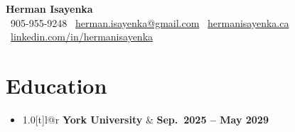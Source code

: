 \documentclass[letterpaper,11pt]{article}
\begin{document}
\begin{center}
  {\Huge \textbf{Herman Isayenka}} \\
  \vspace{4pt}
  \faPhone\ 905-955-9248 \quad
  \faEnvelope\ \href{mailto:herman.isayenka@gmail.com}{herman.isayenka@gmail.com} \quad
  \faGlobe\ \href{https://hermanisayenka.ca}{hermanisayenka.ca} \quad
  \faLinkedin\ \href{https://linkedin.com/in/hermanisayenka}{linkedin.com/in/hermanisayenka}
\end{center}

\section{Education}
\begin{itemize}[leftmargin=0in, label={}]
  \item
  \begin{tabular*}{1.0\textwidth}[t]{l@{\extracolsep{\fill}}r}
    \textbf{York University} & \textbf{\small Sep.\ 2025 -- May 2029} \\
  \end{tabular*}
  \vspace{-6pt}
\end{itemize}
\end{document}
